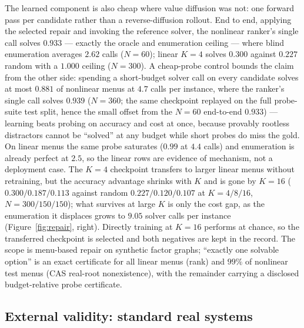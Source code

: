 \documentclass[11pt]{article}
\begin{document}
The learned component is also cheap where value diffusion was not: one forward pass per
candidate rather than a reverse-diffusion rollout. End to end, applying the selected repair and
invoking the reference solver, the nonlinear ranker's single call solves $0.933$ --- exactly the
oracle and enumeration ceiling --- where blind enumeration averages $2.62$ calls ($N{=}60$);
linear $K{=}4$ solves $0.300$ against $0.227$ random with a $1.000$ ceiling ($N{=}300$). A
cheap-probe control bounds the claim from the other side: spending a short-budget solver call
on every candidate solves at most $0.881$ of nonlinear menus at $4.7$ calls per instance,
where the ranker's single call solves $0.939$ ($N{=}360$; the same checkpoint replayed on the
full probe-suite test split, hence the small offset from the $N{=}60$ end-to-end $0.933$) ---
learning beats probing on accuracy and cost at once,
because provably rootless distractors cannot be ``solved'' at any budget while short probes do
miss the gold. On linear menus the same probe saturates ($0.99$ at $4.4$ calls) and enumeration
is already perfect at $2.5$, so the linear rows are evidence of mechanism, not a deployment
case. The $K = 4$
checkpoint transfers to larger linear menus without retraining, but the accuracy advantage
shrinks with $K$ and is gone by $K = 16$ ($0.300/0.187/0.113$ against random
$0.227/0.120/0.107$ at $K = 4/8/16$, $N = 300/150/150$); what survives at large $K$ is only the cost gap, as the enumeration it
displaces grows to $9.05$ solver calls per instance (Figure~\ref{fig:repair}, right). Directly
training at $K = 16$ performs at chance, so the transferred checkpoint is selected and both
negatives are kept in the record. The scope is menu-based repair on synthetic factor graphs;
``exactly one solvable option'' is an exact certificate for all linear menus (rank) and $99\%$
of nonlinear test menus (CAS real-root nonexistence), with the remainder carrying a disclosed
budget-relative probe certificate.

\subsection{External validity: standard real systems}
\label{sec:real}
\end{document}
